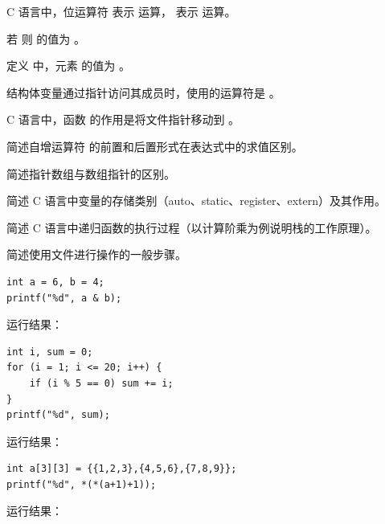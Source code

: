 \documentclass[a4paper,11pt]{article}
\begin{document}
\examtitle


\anslines{0.1cm}

\q C 语言中，位运算符 \code{\&} 表示 \fillblank 运算，\code{|} 表示 \fillblank 运算。

\q 若  则  的值为 \fillblank 。

\q 定义  中，元素  的值为 \fillblank 。

\q 结构体变量通过指针访问其成员时，使用的运算符是 \fillblank 。

\q C 语言中，函数  的作用是将文件指针移动到 \fillblank 。


\q 简述自增运算符 \code{++} 的前置和后置形式在表达式中的求值区别。
\anslines{1.5cm}

\q 简述指针数组与数组指针的区别。
\anslines{1.5cm}

\q 简述 C 语言中变量的存储类别（auto、static、register、extern）及其作用。
\anslines{1.5cm}

\q 简述 C 语言中递归函数的执行过程（以计算阶乘为例说明栈的工作原理）。
\anslines{1.5cm}

\q 简述使用文件进行操作的一般步骤。
\anslines{1.5cm}


\q
\begin{lstlisting}[language={[custom]C}]
int a = 6, b = 4;
printf("%d", a & b);
\end{lstlisting}
运行结果：\underline{\hspace{3cm}}


\q
\begin{lstlisting}[language={[custom]C}]
int i, sum = 0;
for (i = 1; i <= 20; i++) {
    if (i % 5 == 0) sum += i;
}
printf("%d", sum);
\end{lstlisting}
运行结果：\underline{\hspace{3cm}}


\q
\begin{lstlisting}[language={[custom]C}]
int a[3][3] = {{1,2,3},{4,5,6},{7,8,9}};
printf("%d", *(*(a+1)+1));
\end{lstlisting}
运行结果：\underline{\hspace{3cm}}
\end{document}
